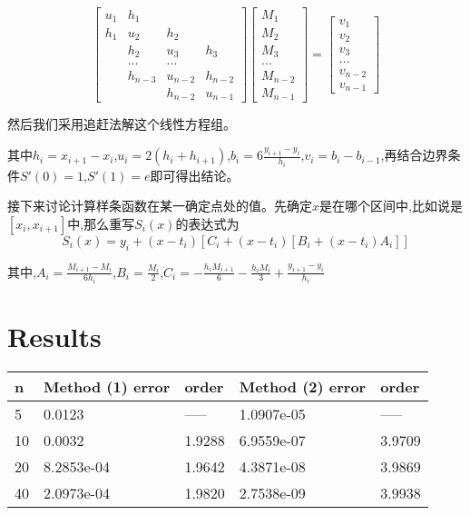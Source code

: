 \documentclass{article}
\begin{document}
	\begin{equation}
		\left[
		\begin{array}{cccc}
			u_{1}& h_{1} &  &   \\
			h_{1}& u_{2} &h_{2}&   \\
			  &h_{2} &u_{3}&h_{3}       \\
		 	        &... & ...  &  \\
			            &h_{n-3} &u_{n-2} &h_{n-2} \\
			            &        &h_{n-2} &u_{n-1} 
			
		\end{array}
		\right ]
		\left[
		\begin{array}{cccc}
			M_{1}\\
			M_{2}\\
			M_{3}\\
			... \\
			M_{n-2}\\
			M_{n-1}
		\end{array}
		\right ]
		=
		\left[
		\begin{array}{cccc}
				v_{1}\\
			v_{2}\\
			v_{3}\\
			... \\
			v_{n-2}\\
			v_{n-1}
		\end{array}
		\right ]
	\end{equation}

然后我们采用追赶法解这个线性方程组。

其中$h_i=x_{i+1}-x_i$,$u_i=2(h_i+h_{i+1})$,$b_i=6\frac{y_{i+1}-y_i}{h_i}$,$v_i=b_i-b_{i-1}$,再结合边界条件$S'(0)=1$,$S'(1)=e$即可得出结论。

接下来讨论计算样条函数在某一确定点处的值。先确定$x$是在哪个区间中,比如说是$[x_i,x_{i+1}]$中,那么重写$S_i(x)$的表达式为
$$S_i(x)=y_i+(x-t_i)[C_i+(x-t_i)[B_i+(x-t_i)A_i]]$$

其中,$A_i=\frac{M_{i+1}-M_i}{6h_i}$,$B_i=\frac{M_i}{2}$,$C_i=-\frac{h_iM_{i+1}}{6}-\frac{h_iM_i}{3}+\frac{y_{i+1}-y_i}{h_i}$

	\section{Results}
	

\begin{table}[h]
	\setlength\tabcolsep{25pt}
	\begin{tabular}{|l|l|l|l|l|}
		\hline
		n  & Method (1) error & order  & Method (2) error & order  \\ \hline
		5  & 0.0123           & -----  & 1.0907e-05       & -----  \\ \hline
		10 & 0.0032           & 1.9288 & 6.9559e-07       & 3.9709 \\ \hline
		20 & 8.2853e-04       & 1.9642 & 4.3871e-08       & 3.9869 \\ \hline
		40 & 2.0973e-04       & 1.9820 & 2.7538e-09       & 3.9938 \\ \hline
	\end{tabular}
\end{table}
	
\end{document}
